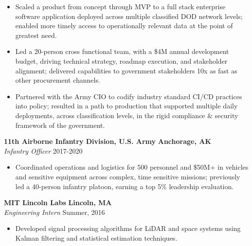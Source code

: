 \documentclass[letterpaper,10pt]{article}
\newenvironment{tightitemize}{%
  \begin{itemize}[
    itemsep=0pt, %
    topsep=0pt, %
    leftmargin=12pt, %
    rightmargin=60pt, %
    parsep=0pt,
    partopsep=0pt,
    label=\scriptsize$\bullet$ %
  ]%
  \footnotesize
}{%
  \end{itemize}
}
\begin{document}
        \begin{tightitemize}
            \item Scaled a product from concept through MVP to a full stack enterprise software application deployed across multiple classified DOD network levels; enabled more timely access to operationally relevant data at the point of greatest need.
            \item Led a 20-person cross functional team, with a \$4M annual development budget, driving technical strategy, roadmap execution, and stakeholder alignment; delivered capabilities to government stakeholders 10x as fast as other procurement channels. 
            \item Partnered with the Army CIO to codify industry standard CI/CD practices into policy; resulted in a path to production that supported multiple daily deployments, across classification levels, in the rigid compliance \& security framework of the government. 
        \end{tightitemize}
        \vspace{-2pt}
    \textbf{11th Airborne Infantry Division, U.S. Army} \hfill \textbf{Anchorage, AK} \\
    \hspace*{0.5pt}\textit{Infantry Officer} \hfill  2017\hspace{2pt}-\hspace{2pt}2020 \\
        \vspace{-16pt}
        \begin{tightitemize}
            \item Coordinated operations and logistics for 500 personnel and \$50M+ in vehicles and sensitive equipment across complex, time sensitive missions; previously led a 40-person infantry platoon, earning a top 5\% leadership evaluation.
        \end{tightitemize}
        \vspace{-2pt}
        \textbf{MIT Lincoln Labs} \hfill \textbf{Lincoln, MA} \\
    \hspace*{0.5pt}\textit{Engineering Intern} \hfill  Summer, 2016 \\
        \vspace{-16pt}
        \begin{tightitemize}
            \item Developed signal processing algorithms for LiDAR and space systems using Kalman filtering and statistical estimation techniques.
        \end{tightitemize}
\medskip
\end{document}
